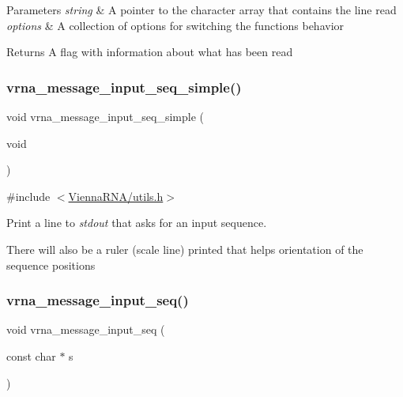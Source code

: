 \begin{DoxyParams}{Parameters}
{\em string} & A pointer to the character array that contains the line read \\
\hline
{\em options} & A collection of options for switching the functions behavior \\
\hline
\end{DoxyParams}
\begin{DoxyReturn}{Returns}
A flag with information about what has been read 
\end{DoxyReturn}
\mbox{\label{group__utils_gaee1dd652ca5b9e56b096963a1576f73b}} 
\subsubsection{\texorpdfstring{vrna\+\_\+message\+\_\+input\+\_\+seq\+\_\+simple()}{vrna\_message\_input\_seq\_simple()}}
{\footnotesize\ttfamily void vrna\+\_\+message\+\_\+input\+\_\+seq\+\_\+simple (\begin{DoxyParamCaption}\item[{void}]{ }\end{DoxyParamCaption})}



{\ttfamily \#include $<$\mbox{\hyperlink{utils_8h}{Vienna\+R\+N\+A/utils.\+h}}$>$}



Print a line to {\itshape stdout} that asks for an input sequence. 

There will also be a ruler (scale line) printed that helps orientation of the sequence positions \mbox{\label{group__utils_gaf4d194d558b0c975f269de01dea52460}} 
\subsubsection{\texorpdfstring{vrna\+\_\+message\+\_\+input\+\_\+seq()}{vrna\_message\_input\_seq()}}
{\footnotesize\ttfamily void vrna\+\_\+message\+\_\+input\+\_\+seq (\begin{DoxyParamCaption}\item[{const char $\ast$}]{s }\end{DoxyParamCaption})}



